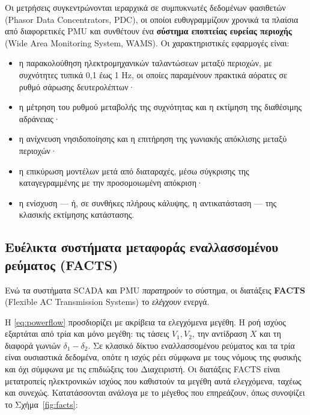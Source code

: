 Οι μετρήσεις συγκεντρώνονται ιεραρχικά σε συμπυκνωτές δεδομένων φασιθετών (Phasor Data
Concentrators, PDC), οι οποίοι ευθυγραμμίζουν χρονικά τα πλαίσια από διαφορετικές PMU και
συνθέτουν ένα \textbf{σύστημα εποπτείας ευρείας περιοχής} (Wide Area Monitoring System,
WAMS). Οι χαρακτηριστικές εφαρμογές είναι:

\begin{itemize}
\item η παρακολούθηση ηλεκτρομηχανικών ταλαντώσεων μεταξύ περιοχών, με συχνότητες τυπικά
      0,1 έως 1 Hz, οι οποίες παραμένουν πρακτικά αόρατες σε ρυθμό σάρωσης δευτερολέπτων·
\item η μέτρηση του ρυθμού μεταβολής της συχνότητας και η εκτίμηση της διαθέσιμης
      αδράνειας·
\item η ανίχνευση νησιδοποίησης και η επιτήρηση της γωνιακής απόκλισης μεταξύ περιοχών·
\item η επικύρωση μοντέλων μετά από διαταραχές, μέσω σύγκρισης της καταγεγραμμένης με την
      προσομοιωμένη απόκριση·
\item η ενίσχυση — ή, σε συνθήκες πλήρους κάλυψης, η αντικατάσταση — της κλασικής εκτίμησης
      κατάστασης.
\end{itemize}

\subsection{Ευέλικτα συστήματα μεταφοράς εναλλασσομένου ρεύματος (FACTS)}

Ενώ τα συστήματα SCADA και PMU \emph{παρατηρούν} το σύστημα, οι διατάξεις \textbf{FACTS}
(Flexible AC Transmission Systems) το \emph{ελέγχουν} ενεργά.

Η \eqref{eq:powerflow} προσδιορίζει με ακρίβεια τα ελεγχόμενα μεγέθη. Η ροή ισχύος
εξαρτάται από τρία και μόνο μεγέθη: τις τάσεις $V_1, V_2$, την αντίδραση $X$ και τη διαφορά
γωνιών $\delta_1 - \delta_2$. Σε κλασικό δίκτυο εναλλασσομένου ρεύματος και τα τρία είναι
ουσιαστικά δεδομένα, οπότε η ισχύς ρέει σύμφωνα με τους νόμους της φυσικής και όχι σύμφωνα
με τις επιδιώξεις του Διαχειριστή. Οι διατάξεις FACTS είναι μετατροπείς ηλεκτρονικών ισχύος
που καθιστούν τα μεγέθη αυτά ελεγχόμενα, ταχέως και συνεχώς. Κατατάσσονται ανάλογα με το
μέγεθος που επηρεάζουν, όπως συνοψίζει το Σχήμα~\ref{fig:facts}:

